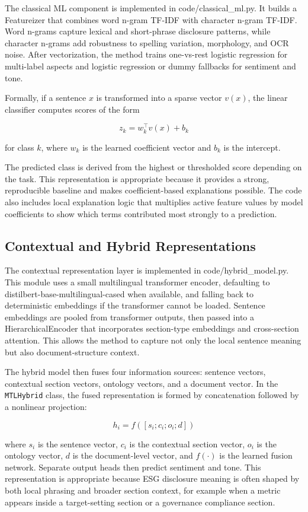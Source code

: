 The classical ML component is implemented in code/classical\_ml.py. It builds a Featureizer that combines word n-gram TF-IDF with character n-gram TF-IDF. Word n-grams capture lexical and short-phrase disclosure patterns, while character n-grams add robustness to spelling variation, morphology, and OCR noise. After vectorization, the method trains one-vs-rest logistic regression for multi-label aspects and logistic regression or dummy fallbacks for sentiment and tone.

Formally, if a sentence \(x\) is transformed into a sparse vector \(v(x)\),
the linear classifier computes scores of the form

\[
z_k = w_k^\top v(x) + b_k
\]

for class \(k\), where \(w_k\) is the learned coefficient vector and \(b_k\)
is the intercept. 

The predicted class is derived from the highest or thresholded score depending on the task. This representation is appropriate because it provides a strong, reproducible baseline and makes coefficient-based explanations possible. The code also includes local explanation logic that multiplies active feature values by model coefficients to show which terms contributed most strongly to a prediction.

\subsection{Contextual and Hybrid Representations}

The contextual representation layer is implemented in code/hybrid\_model.py. This module uses a small multilingual transformer encoder, defaulting to distilbert-base-multilingual-cased when available, and falling back to deterministic embeddings if the transformer cannot be loaded. Sentence embeddings are pooled from transformer outputs, then passed into a HierarchicalEncoder that incorporates section-type embeddings and cross-section attention. This allows the method to capture not only the local sentence meaning but also document-structure context.

The hybrid model then fuses four information sources: sentence vectors,
contextual section vectors, ontology vectors, and a document vector. In the
\texttt{MTLHybrid} class, the fused representation is formed by concatenation
followed by a nonlinear projection:

\[
h_i = f\left([s_i ; c_i ; o_i ; d]\right)
\]

where \(s_i\) is the sentence vector, \(c_i\) is the contextual section vector,
\(o_i\) is the ontology vector, \(d\) is the document-level vector, and
\(f(\cdot)\) is the learned fusion network. Separate output heads then predict
sentiment and tone. This representation is appropriate because ESG disclosure
meaning is often shaped by both local phrasing and broader section context,
for example when a metric appears inside a target-setting section or a
governance compliance section.

